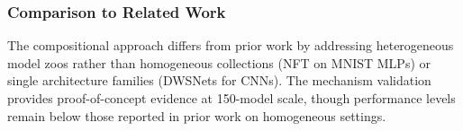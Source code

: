 \subsubsection{Comparison to Related Work}

The compositional approach differs from prior work by addressing heterogeneous model zoos rather than homogeneous collections (NFT on MNIST MLPs) or single architecture families (DWSNets for CNNs). The mechanism validation provides proof-of-concept evidence at 150-model scale, though performance levels remain below those reported in prior work on homogeneous settings.
